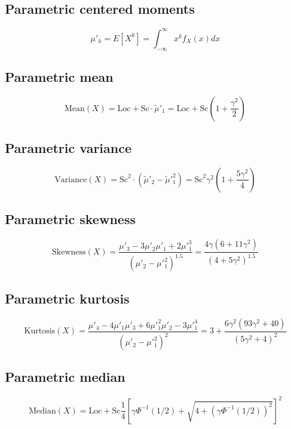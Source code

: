 \documentclass{article}
\begin{document}
\subsection{Parametric centered moments}
\begin{equation*} \mu'_{k}=E[X^k]=\int_{-\infty }^{\infty }x^{k}f_{X}\left(x\right)dx \end{equation*}
\subsection{Parametric mean}
\begin{equation*} \mathrm{Mean}(X)=\text{Loc}+\text{Sc}\cdot\tilde{\mu}'_{1}=\text{Loc}+\text{Sc}\left(1+\frac{\gamma^2}{2}\right) \end{equation*}
\subsection{Parametric variance}
\begin{equation*} \mathrm{Variance}(X)=\text{Sc}^{2}\cdot(\tilde{\mu}'_{2}-\tilde{\mu}'^{2}_{1})=\text{Sc}^{2}\gamma^{2}\left(1+\frac{5\gamma^{2}}{4}\right) \end{equation*}
\subsection{Parametric skewness}
\begin{equation*} \mathrm{Skewness}(X)=\frac{\mu'_{3}-3\mu'_{2}\mu'_{1}+2\mu'^{3}_{1}}{(\mu'_{2}-\mu'^{2}_{1})^{1.5}}=\frac{4\gamma(6+11\gamma^2)}{(4+5\gamma^2)^{1.5}} \end{equation*}
\subsection{Parametric kurtosis}
\begin{equation*} \mathrm{Kurtosis}(X)=\frac{\mu'_{4}-4\mu'_{1}\mu'_{3}+6\mu'^{2}_{1}\mu'_{2}-3\mu'^{4}_{1}}{(\mu'_{2}-\mu'^{2}_{1})^{2}}=3+\frac{ 6 \gamma^2 ( 93 \gamma^2+40 ) }{ ( 5 \gamma^2+4 )^2 } \end{equation*}
\subsection{Parametric median}
\begin{equation*} \mathrm{Median}(X)=\text{Loc}+\text{Sc}\frac{1}{4}\left[\gamma\Phi^{-1}\left(1/2\right)+\sqrt{4+\left(\gamma\Phi^{-1}\left(1/2\right)\right)^2}\right]^2 \end{equation*}
\end{document}
